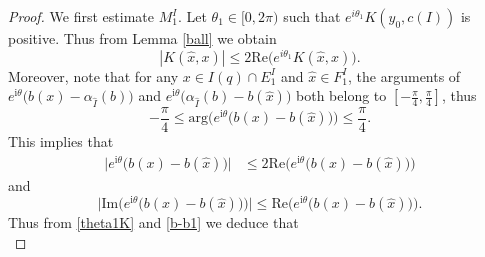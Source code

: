 \documentclass[oneside,english,a4wide]{amsart}
\numberwithin{equation}{section}
\numberwithin{figure}{section}
\theoremstyle{plain}
\theoremstyle{plain}
\theoremstyle{definition}
\theoremstyle{plain}
\theoremstyle{remark}
\theoremstyle{definition}
\theoremstyle{remark}
\theoremstyle{definition}
\newcommand{\8}{\infty}
\begin{document}
\begin{proof}
	
	We first estimate $M_1^I$.
	Let $\theta_1\in [0,2\pi)$ such that $e^{i\theta_1}K(y_0,c(I))$ is  positive. Thus from Lemma \ref{ball} we obtain
	\begin{equation}\label{theta1K}
		|K(\hat{x},x)| \le 2\text{Re}\big(e^{i\theta_1}K(\hat{x},x)\big).
	\end{equation}
	Moreover, note that for any $x\in I(q)\cap E_1^I$ and $\hat{x}\in F_1^I$, the arguments of $e^{\mathrm{i}{\theta}}\big(b({x})-\alpha_{\hat{I}}(b)\big)$ and $e^{\mathrm{i}{\theta}}\big(\alpha_{\hat{I}}(b)-b(\hat{x})\big)$ both belong to $[-\frac{\pi}{4},\frac{\pi}{4}]$, thus
	\begin{equation*}
		-\frac{\pi}{4}\le \mathrm{arg}\Big(e^{\mathrm{i}{\theta}}\big(b(x)-b(\hat{x})\big)\Big)\le \frac{\pi}{4}.
	\end{equation*}
	This implies that
	\begin{equation}\label{b-b1}
		\begin{aligned}
			\big|e^{\mathrm{i}{\theta}}\big(b(x)-b(\hat{x})\big)\big|{}&
			\le 2\mathrm{Re}\Big(e^{\mathrm{i}{\theta}}\big(b(x)-b(\hat{x})\big)\Big)
		\end{aligned}
	\end{equation} 
	and
	\begin{equation}\label{imreb1}
		\Big|\mathrm{Im}\Big(e^{\mathrm{i}{\theta}}\big(b(x)-b(\hat{x})\big)\Big)\Big|\le \mathrm{Re}\Big(e^{\mathrm{i}{\theta}}\big(b(x)-b(\hat{x})\big)\Big).
	\end{equation}
	Thus from \eqref{theta1K} and \eqref{b-b1} we deduce that
	\begin{equation*}

\end{equation*}
\end{proof}
\end{document}
